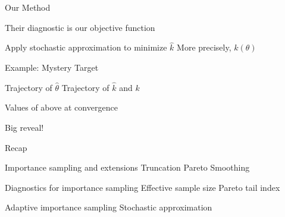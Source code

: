 \documentclass[14pt]{beamer}
\begin{document}
\begin{frame}{Our Method}
    \begin{outline}
        \1 Their diagnostic is our objective function \newline

        \1 Apply stochastic approximation to minimize $\hat{k}$
            \2 More precisely, $k(\theta)$
    \end{outline}
\end{frame}

\begin{frame}{Example: Mystery Target}
    \begin{outline}
        \1 Trajectory of $\hat{\theta}$
        \1 Trajectory of $\hat{k}$ and $k$ \newline

        \1 Values of above at convergence \newline

        \1 Big reveal!
    \end{outline}
\end{frame}

\begin{frame}{Recap}
    \begin{outline}
        \1 Importance sampling and extensions
            \2 Truncation
            \2 Pareto Smoothing \newline
        
        \1 Diagnostics for importance sampling
            \2 Effective sample size
            \2 Pareto tail index \newline

        \1 Adaptive importance sampling
            \2 Stochastic approximation
    \end{outline}
\end{frame}



\end{document}
